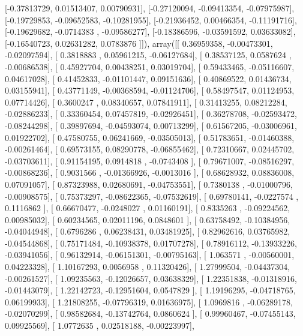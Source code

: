 \documentclass{article}
\begin{document}
       [-0.37813729,  0.01513407,  0.00790931],
       [-0.27120094, -0.09413354, -0.07975987],
       [-0.19729853, -0.09652583, -0.10281955],
       [-0.21936452,  0.00466354, -0.11191716],
       [-0.19629682, -0.0714383 , -0.09586277],
       [-0.18386596, -0.03591592,  0.03633082],
       [-0.16540723,  0.02631282,  0.0783876 ]]), array([[ 0.36959358, -0.00473301, -0.02097594],
       [ 0.3818883 ,  0.05961215, -0.06127684],
       [ 0.38537125,  0.0587624 , -0.00686538],
       [ 0.45927704,  0.00438251,  0.03019704],
       [ 0.59433465, -0.05116607,  0.04617028],
       [ 0.41452833, -0.01101447,  0.09151636],
       [ 0.40869522,  0.01436734,  0.03155941],
       [ 0.43771149, -0.00368594, -0.01124706],
       [ 0.58497547,  0.01124953,  0.07714426],
       [ 0.3600247 ,  0.08340657,  0.07841911],
       [ 0.31413255,  0.08212284, -0.02886233],
       [ 0.33360454,  0.07457819, -0.02926451],
       [ 0.36278708, -0.02593472, -0.08244298],
       [ 0.39897694, -0.04593074,  0.00713299],
       [ 0.61567205, -0.03006961,  0.01922702],
       [ 0.47580755,  0.06241669, -0.03505013],
       [ 0.51783651, -0.01460388, -0.00261464],
       [ 0.69573155,  0.08290778, -0.06855462],
       [ 0.72310667,  0.02445702, -0.03703611],
       [ 0.91154195,  0.0914818 , -0.0743408 ],
       [ 0.79671007, -0.08516297, -0.00868236],
       [ 0.9031566 , -0.01366926, -0.0013016 ],
       [ 0.68628932,  0.08836008,  0.07091057],
       [ 0.87323988,  0.02680691, -0.04753551],
       [ 0.7380138 , -0.01000796, -0.00908575],
       [ 0.75373297, -0.08622365, -0.07532619],
       [ 0.69780141, -0.0227574 ,  0.1116862 ],
       [ 0.66670477, -0.0248027 ,  0.01160191],
       [ 0.8335263 , -0.09224562,  0.00985032],
       [ 0.60234565,  0.02011196,  0.0848601 ],
       [ 0.63758492, -0.10384956, -0.04044948],
       [ 0.6796286 ,  0.06238431,  0.03481925],
       [ 0.82962616,  0.03765982, -0.04544868],
       [ 0.75171484, -0.10938378,  0.01707278],
       [ 0.78916112, -0.13933226, -0.03941056],
       [ 0.96132914, -0.06151301, -0.00795163],
       [ 1.063571  , -0.00560001,  0.04223328],
       [ 1.10167293,  0.0056958 ,  0.11320426],
       [ 1.27999504, -0.04437304, -0.00261527],
       [ 1.09235563, -0.12026657,  0.03638329],
       [ 1.22351838, -0.01318916, -0.01443079],
       [ 1.22142723, -0.12951604,  0.0547829 ],
       [ 1.19196295, -0.04718765,  0.06199933],
       [ 1.21808255, -0.07796319,  0.01636975],
       [ 1.0969816 , -0.06289178, -0.02070299],
       [ 0.98582684, -0.13742764,  0.0860624 ],
       [ 0.99960467, -0.07455143,  0.09925569],
       [ 1.0772635 ,  0.02518188, -0.00223997],
\end{document}
